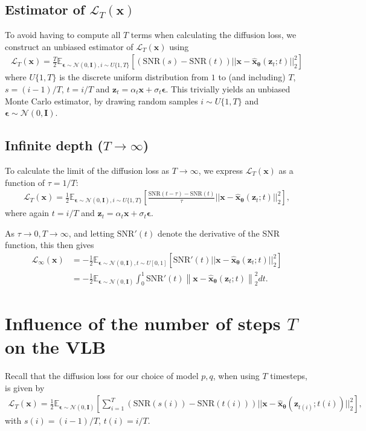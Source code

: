 \documentclass{article}
\def\rvx{{\mathbf{x}}}
\def\rvz{{\mathbf{z}}}
\newcommand{\E}{\mathbb{E}}
\newcommand{\bT}{{\boldsymbol{\theta}}}
\newcommand{\bfI}{\mathbf{I}}
\newcommand{\bepsilon}{{\boldsymbol{\epsilon}}}
\newcommand{\lT}{\mathcal{L}_T(\rvx)}
\newcommand{\linfty}{\mathcal{L}_{\infty}(\rvx)}
\newcommand{\snr}{\text{SNR}}
\begin{document}
\subsection{Estimator of $\lT$}
To avoid having to compute all $T$ terms when calculating the diffusion loss, we construct an unbiased estimator of $\lT$ using
\begin{align}
\lT =
\frac{T}{2}
\E_{\bepsilon \sim \mathcal{N}(0,\bfI), i \sim U\{1, T\}}
\left[
\left(\text{SNR}(s)-\text{SNR}(t)\right)
||\rvx - \hat{\rvx}_{\bT}(\rvz_t;t) ||_2^2
\right]\end{align}
where $U\{1, T\}$ is the discrete uniform distribution from $1$ to (and including) $T$, $s = (i-1)/T$, $t = i/T$ and $\rvz_t = \alpha_t \rvx + \sigma_t \bepsilon$. This trivially yields an unbiased Monte Carlo estimator, by drawing random samples $i \sim U\{1, T\}$ and $\bepsilon \sim \mathcal{N}(0,\bfI)$.







\subsection{Infinite depth ($T \to \infty$) }\label{sec:infdepth}
To calculate the limit of the diffusion loss as $T\rightarrow\infty$, we express $\lT$ as a function of $\tau = 1/T$:
\begin{align}
\lT =
\frac{1}{2}
\E_{\bepsilon \sim \mathcal{N}(0,\bfI), i \sim U\{1, T\}}
\left[
\frac{\text{SNR}(t-\tau)-\text{SNR}(t)}{\tau}
||\rvx - \hat{\rvx}_{\bT}(\rvz_t;t) ||_2^2
\right],
\end{align}
where again $t = i/T$ and $\rvz_t = \alpha_t \rvx + \sigma_t \bepsilon$.

As $\tau \rightarrow 0, T \rightarrow \infty$, and letting $\snr'(t)$ denote the derivative of the SNR function, this then gives
\begin{align}
\linfty &=
-\frac{1}{2}
\E_{\bepsilon \sim \mathcal{N}(0,\bfI), t \sim U[0,1]}
\left[\snr'(t)||\rvx - \hat{\rvx}_{\bT}(\rvz_t;t) ||_2^2
\right]\\
&= -\frac{1}{2}\E_{\bepsilon\sim\mathcal{N}(0,\bfI)} \int_{0}^{1} \snr'(t) \left\rVert \rvx - \hat{\rvx}_{\bT}(\rvz_t;t) \right\lVert_{2}^{2} dt
.
\end{align}

\section{Influence of the number of steps $T$ on the VLB}
\label{appendix:more_steps}
Recall that the diffusion loss for our choice of model $p,q$, when using $T$ timesteps, is given by
\begin{align}
\lT =
\frac{1}{2}\E_{\bepsilon \sim \mathcal{N}(0,\bfI)}
\left[\sum_{i=1}^T
\left(\snr(s(i))-\snr(t(i))\right)
||\rvx - \hat{\rvx}_{\bT}(\rvz_{t(i)};t(i)) ||_2^2
\right],
\end{align}
with $s(i) = (i-1)/T$, $t(i) = i/T$.
\end{document}
